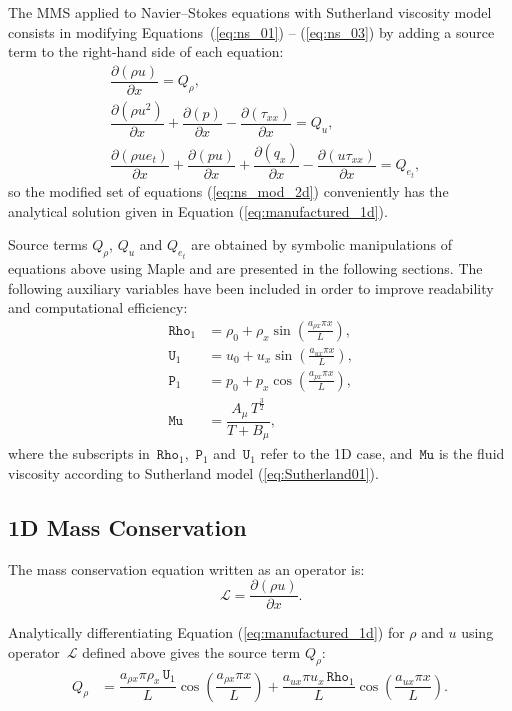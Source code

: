\documentclass[10pt]{article}
\newcommand{\Diff}[2] {\dfrac{\partial( #1)}{\partial #2}}
\newcommand{\Rho}{\,\mathtt{Rho}}
\newcommand{\PP}{\,\mathtt{P}}
\newcommand{\U}{\,\mathtt{U}}
\newcommand{\Lo}{\,\mathcal{L}}
\newcommand{\MU}{\,\mathtt{Mu}}
\begin{document}
The MMS applied to Navier--Stokes equations with Sutherland viscosity model  consists in modifying Equations~(\ref{eq:ns_01}) -- (\ref{eq:ns_03}) by adding a source term to the right-hand side of each equation:
\begin{equation}
 \label{eq:ns_mod_2d}
\begin{split}
&\Diff{\rho u}{x} = Q_\rho,\\
&\Diff{\rho u^2 }{x}+ \Diff{p}{x} -\Diff{\tau_{xx}}{x}= Q_u,\\
&\Diff{\rho ue_t}{x}+ \Diff{pu}{x}+ \Diff{q_x}{x}-\Diff{u\tau_{xx}}{x} = Q_{e_t},
\end{split}
\end{equation}
%
so the modified set of equations (\ref{eq:ns_mod_2d}) conveniently has the analytical solution given in Equation (\ref{eq:manufactured_1d}).
%

Source terms $Q_\rho$, $Q_u$ and $Q_{e_t}$ are obtained by symbolic manipulations of equations above using Maple and are presented in the following sections. The following auxiliary variables have been included in order to improve readability and computational efficiency:
\begin{equation*}
 \begin{split}
\label{eq:aux_1d}
\Rho_1 &= \rho_{0}+ \rho_{x} \sin\left(\frac{a_{ \rho x} \pi x}{L}\right),\\
\U_1 &= u_{0}+u_{x} \sin\left(\frac{a_{u x} \pi x}{L}\right),\\
\PP_1 &= p_{0}+p_{x} \cos\left(\frac{a_{p x} \pi x}{L}\right),\\
\MU  &=\dfrac{A_\mu \, T^{\frac{3}{2}}}{T+B_\mu},
\end{split}
\end{equation*}
where the subscripts in $\Rho_1$, $\PP_1$ and $\U_1$ refer to the 1D case, and $\MU$ is the fluid viscosity according to Sutherland model (\ref{eq:Sutherland01}).

\subsection{1D Mass Conservation}

The mass conservation equation written as an operator is:
\begin{equation*}
 \Lo= \Diff{\rho u}{x}.
\end{equation*}

Analytically differentiating Equation (\ref{eq:manufactured_1d}) for $\rho$ and $u$  using operator $\Lo$ defined above gives  the source term $Q_{\rho}$:
\begin{equation}
 \begin{split}
Q_\rho &= \dfrac{a_{\rho x} \pi \rho_x \U_1}{L}\cos\left(\dfrac{a_{\rho x} \pi x}{L}\right)+\dfrac{a_{ux} \pi u_x \Rho_1}{L}\cos\left(\dfrac{a_{ux} \pi x}{L}\right) .
 \end{split}
\end{equation}
\end{document}
